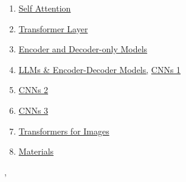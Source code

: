 \documentclass[11pt]{article}
\renewcommand{\today}{\shortmonthname[\the\month] \the \day,  \the\year}
\begin{document}
\begin{multicols}{2}
\begin{enumerate}
		\item  \href{https://mp.weixin.qq.com/s/JX6kXGq6HsAkWJb6qMG1vA}{Self Attention}%
		\item  \href{https://mp.weixin.qq.com/s/ugOI3plvRLfqYV1qD1fLGA}{Transformer Layer} %
		\item  \href{https://mp.weixin.qq.com/s/bB--SdGdnGyNJGpd07T43g}{Encoder and Decoder-only Models} %
		\item  \href{https://mp.weixin.qq.com/s/JkcRNZG2m5YRAUfp-PMvNw}{LLMs \& Encoder-Decoder Models,} \href{https://mp.weixin.qq.com/s/POMxBTDuDojnSeA5vjyE-g}{CNNs 1} %
		\item  \href{https://mp.weixin.qq.com/s/M1JlJad9qMe-V5fniMFycQ}{CNNs 2} %
		\item  \href{https://mp.weixin.qq.com/s/ndRWzUxRExv3KMM7iv_AiA}{CNNs 3 }%
		\item  \href{https://mp.weixin.qq.com/s/PFB69wkqiRxmmlwH24zfSg}{Transformers for Images}%
		\item  \href{https://pan.baidu.com/s/16XB_kmSYBKkkQTVN0y2Gdw}{Materials}
	\end{enumerate}
\end{multicols}




%
\begin{flushright}
	\tiny \today 
\end{flushright}
\end{document}
